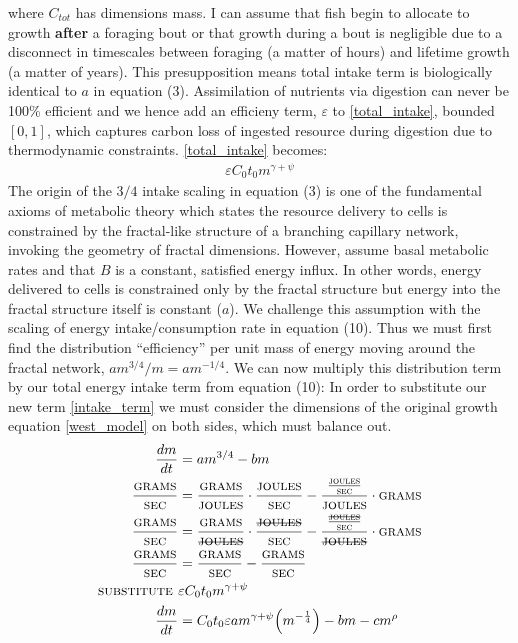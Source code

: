 \documentclass[a4paper]{article} %
\begin{document}
where $C_{tot}$ has dimensions mass. I can assume that fish begin to allocate to growth \textbf{after} a foraging bout or that growth during a bout is negligible due to a disconnect in timescales between foraging (a matter of hours) and lifetime growth (a matter of years). This presupposition means total intake term is biologically identical to $a$ in equation (3). Assimilation of nutrients via digestion can never be 100\% efficient and we hence add an efficieny term, $\varepsilon$ to \eqref{total_intake}, bounded $[0,1]$, which captures carbon loss of ingested resource during digestion due to thermodynamic constraints. \eqref{total_intake} becomes:
\begin{align}
    \varepsilon C_{0}t_{0}m^{\gamma + \psi} \label{intake_term}
\end{align} 
The origin of the $3/4$ intake scaling in equation (3) is one of the fundamental axioms of metabolic theory \autocite{West1997,West2001} which states the resource delivery to cells is constrained by the fractal-like structure of a branching capillary network, invoking the geometry of fractal dimensions. However, \cite{West2001} assume basal metabolic rates and that $B$ is a constant, satisfied energy influx. In other words, energy delivered to cells is constrained only by the fractal structure but energy into the fractal structure itself is constant ($a$). We challenge this assumption with the scaling of energy intake/consumption rate in equation (10). Thus we must first find the distribution ``efficiency'' per unit mass of energy moving around the fractal network, ${am^{3/4}}/m = am^{-1/4}$. We can now multiply this distribution term by our total energy intake term from equation (10):
In order to substitute our new term \eqref{intake_term} we must consider the dimensions of the original growth equation \eqref{west_model} on both sides, which must balance out.
\begin{align}
    \frac{dm}{dt} &= am^{3/4} - bm \\
    \frac{\textsc{grams}}{\textsc{sec}} &= \frac{\textsc{grams}}{\textsc{joules}}\cdot \frac{\textsc{joules}}{\textsc{sec}} - \frac{\frac{\textsc{joules}}{\textsc{sec}}}{\textsc{joules}}\cdot \textsc{grams} \\
    \frac{\textsc{grams}}{\textsc{sec}} &= \frac{\textsc{grams}}{\st{\textsc{joules}}}\cdot \frac{\st{\textsc{joules}}}{\textsc{sec}} - \frac{\frac{\st{\textsc{joules}}}{\textsc{sec}}}{\st{\textsc{joules}}}\cdot \textsc{grams} \\
    \frac{\textsc{grams}}{\textsc{sec}} &= \frac{\textsc{grams}}{\textsc{sec}} - \frac{\textsc{grams}}{\textsc{sec}} \\
    \textsc{substitute } & \varepsilon C_{0}t_{0}m^{\gamma + \psi} \\
    \frac{dm}{dt} &= C_{0}t_{0}\varepsilon am^{\gamma + \psi}\Big(m^{-\frac{1}{4}}\Big) - bm - cm^{\rho}
\end{align}
\end{document}
